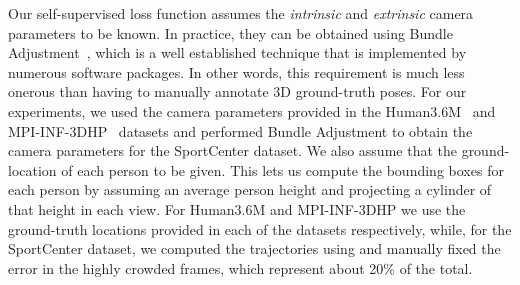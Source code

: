 \documentclass[runningheads]{llncs}
\begin{document}
Our self-supervised loss function assumes the \emph{intrinsic} and \emph{extrinsic} camera parameters to be known. In practice, they can be  obtained using Bundle Adjustment~\cite{Triggs00}, which is a well established technique that is implemented by numerous software packages. In other words, this requirement is much less onerous than having to manually annotate 3D ground-truth poses. For our experiments, we used the camera parameters provided in the Human3.6M~\cite{Ionescu14a} and MPI-INF-3DHP~\cite{Mehta17a} datasets and performed Bundle Adjustment to obtain the camera parameters for the SportCenter dataset. We also assume that the ground-location of each person to be given. This lets us compute the bounding boxes for each person by assuming an average person height and projecting a cylinder of that height in each view. For Human3.6M and MPI-INF-3DHP we use the ground-truth locations provided in each of the datasets respectively, while, for the SportCenter dataset, we computed the trajectories using \cite{Lenz15b,Wang19f} and manually fixed the error in the highly crowded frames, which represent about 20\% of the total.
\end{document}
